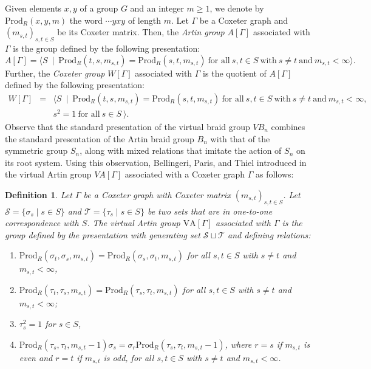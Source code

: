 \documentclass[12pt]{amsart}
\newtheorem{definition}[equation]{Definition}
\numberwithin{equation}{section}
\begin{document}
Given elements $x,y$ of a group $G$ and an integer $m\ge1$,  we denote by $\text{Prod}_{R}(x,y,m)$ the word $\cdots yxy$ of length $m$.  Let $\Gamma$ be a Coxeter graph and $(m_{s,t})_{s,t\in S}$ be its Coxeter matrix.  Then, the {\it Artin group} $A[\Gamma]$ associated with $\Gamma$ is the group defined by the following presentation: 
$$
A[\Gamma]=\Bigg\langle S ~\mid~ \text{Prod}_{R}(t,s,m_{s,t})=\text{Prod}_{R}(s,t,m_{s,t})~\text{for all}~s,t\in S~\text{with}~s\neq t~\text{and}~m_{s,t}<\infty \Bigg\rangle.
$$
Further, the {\it Coxeter group} $W[\Gamma]$ associated with $\Gamma$ is the quotient of $A[\Gamma]$ defined by the following presentation: 
\begin{eqnarray*}
W[\Gamma] &=& \Bigg\langle S ~\mid~\text{Prod}_{R}(t,s,m_{s,t})=\text{Prod}_{R}(s,t,m_{s,t})~\text{for all}~s,t\in S~\text{with}~s\neq t~\text{and}~m_{s,t}<\infty, \\
&&  s^2=1~\text{for all}~s\in S~ \Bigg\rangle.
\end{eqnarray*}
Observe that the standard presentation of the virtual braid group $VB_n$ combines the standard presentation of the Artin braid group $B_n$ with that of the  symmetric group $S_n$, along with mixed relations that imitate the action of $S_n$ on its root system. Using this observation, Bellingeri, Paris, and Thiel introduced in \cite{MR4753773} the virtual Artin group $VA[\Gamma]$ associated with a Coxeter graph $\Gamma$ as follows:

\begin{definition}\label{def_virtual_artin_group}
Let $\Gamma$ be a Coxeter graph  with Coxeter matrix $(m_{s,t})_{s,t\in S}$. Let $\mathcal{S}=\{\sigma_s\mid s\in S\}$ and $\mathcal{T}=\{\tau_s\mid s\in S\}$ be two sets that are in one-to-one correspondence with $S$. The {\it virtual Artin group} $\text{VA}[\Gamma]$ associated with $\Gamma$ is the group defined by the presentation with generating set $\mathcal{S}\sqcup \mathcal{T}$ and defining relations:
\begin{enumerate}
\item $\text{Prod}_{R}(\sigma_t,\sigma_s,m_{s,t})=\text{Prod}_{R}(\sigma_s,\sigma_t,m_{s,t})$ for all $s,t\in S$ with $s\neq t$ and $m_{s,t} < \infty$,
\item $\text{Prod}_{R}(\tau_t,\tau_s,m_{s,t})=\text{Prod}_{R}(\tau_s,\tau_t,m_{s,t})$ for all $s,t\in S$ with $s\neq t$ and $m_{s,t} < \infty$; 
\item[] $\tau_s^2=1$ for $s\in S$,
\item $\text{Prod}_{R}(\tau_s,\tau_t,m_{s,t}-1)\sigma_s=\sigma_r\text{Prod}_{R}(\tau_s,\tau_t,m_{s,t}-1)$, where $r=s $ if $m_{s,t}$ is even and $r=t $ if $m_{s,t}$ is odd, for all $s,t\in S$ with $s\neq t$ and $m_{s,t} < \infty$.
\end{enumerate}
\end{definition}
\end{document}
